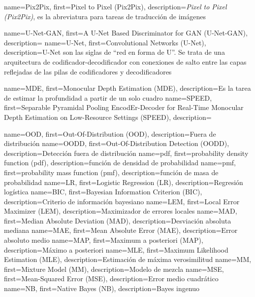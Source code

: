   {name={Pix2Pix}, first={Pixel to Pixel (Pix2Pix)}, description={\textit{Pixel to Pixel (Pix2Pix)}, es la abreviatura para tareas de traducción de imágenes}}


    {name={U-Net-GAN}, first={A U-Net Based Discriminator for GAN (U-Net-GAN)}, description={}}
        {name={U-Net}, first={Convolutional Networks (U-Net)}, description={U-Net son las siglas de ``red en forma de U''. Se trata de una arquitectura de codificador-decodificador con conexiones de salto entre las capas reflejadas de las pilas de codificadores y decodificadores}}


      {name={MDE}, first={Monocular Depth Estimation (MDE)}, description={Es la tarea de estimar la profundidad a partir de un solo cuadro}}
    {name={SPEED}, first={Separable Pyramidal Pooling EncodEr-Decoder for Real-Time Monocular Depth Estimation on Low-Resource Settings (SPEED)}, description={}}

  {name={OOD},        first={Out-Of-Distribution (OOD)},                  description={Fuera de distribución}}
 {name={OODD},       first={Out-Of-Distribution Detection (OODD)},       description={Detección fuera de distribución}}
  {name={pdf},        first={probability density function (pdf)},         description={función de densidad de probabilidad}}
  {name={pmf},        first={probability mass function (pmf)},            description={función de masa de probabilidad}}
   {name={LR},         first={Logistic Regression (LR)},                   description={Regresión logística}}
  {name={BIC},        first={Bayesian Information Criterion (BIC)},       description={Criterio de información bayesiano}}
  {name={LEM},        first={Local Error Maximizer (LEM)},                description={Maximizador de errores locales}}
  {name={MAD},        first={Median Absolute Deviation (MAD)},            description={Desviación absoluta mediana}}
  {name={MAE},        first={Mean Absolute Error (MAE)},                  description={Error absoluto medio}}
  {name={MAP},        first={Maximum a posteriori (MAP)},                 description={Máximo a posteriori}}
  {name={MLE},        first={Maximum Likelihood Estimation (MLE)},        description={Estimación de máxima verosimilitud}}
   {name={MM},         first={Mixture Model (MM)},                         description={Modelo de mezcla}}
  {name={MSE},        first={Mean-Squared Error (MSE)},                   description={Error medio cuadrático}}
   {name={NB},         first={Native Bayes (NB)},                          description={Bayes ingenuo}}



